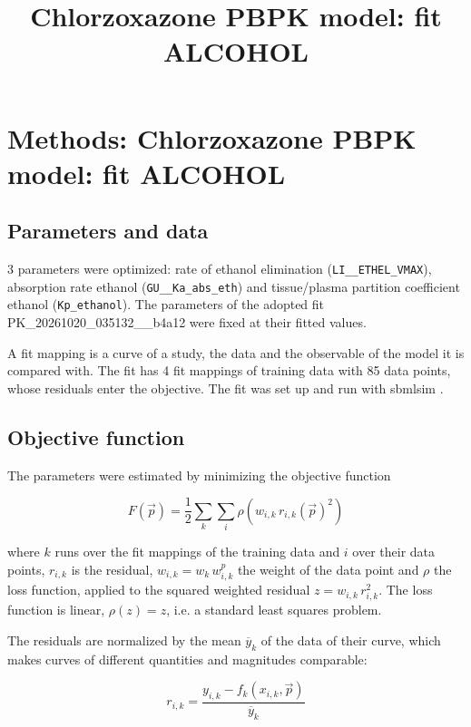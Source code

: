 \documentclass{article}
\title{Chlorzoxazone PBPK model: fit ALCOHOL}
\date{}
\begin{document}
\maketitle

\section{Methods: Chlorzoxazone PBPK model: fit ALCOHOL}

\subsection{Parameters and data}

3 parameters were optimized: rate of ethanol elimination (\texttt{LI\_\_ETHEL\_VMAX}), absorption rate ethanol (\texttt{GU\_\_Ka\_abs\_eth}) and tissue/plasma partition coefficient ethanol (\texttt{Kp\_ethanol}). The parameters of the adopted fit PK\_20261020\_035132\_\_b4a12 were fixed at their fitted values.

A fit mapping is a curve of a study, the data and the observable of the model it is compared with. The fit has 4 fit mappings of training data with 85 data points, whose residuals enter the objective. The fit was set up and run with sbmlsim \cite{Koenig2026_sbmlsim}.

\subsection{Objective function}

The parameters were estimated by minimizing the objective function

\begin{equation}
F(\vec{p}) = \frac{1}{2} \sum_{k} \sum_{i} \rho\left(w_{i,k}\, r_{i,k}(\vec{p})^2\right)
\end{equation}

where $k$ runs over the fit mappings of the training data and $i$ over their data points, $r_{i,k}$ is the residual, $w_{i,k} = w_k\, w^{p}_{i,k}$ the weight of the data point and $\rho$ the loss function, applied to the squared weighted residual $z = w_{i,k}\, r_{i,k}^2$. The loss function is linear, $\rho(z) = z$, i.e. a standard least squares problem.

The residuals are normalized by the mean $\overline{y}_k$ of the data of their curve, which makes curves of different quantities and magnitudes comparable:

\begin{equation}
r_{i,k} = \frac{y_{i,k} - f_k(x_{i,k}, \vec{p})}{\overline{y}_k}
\end{equation}
\end{document}

